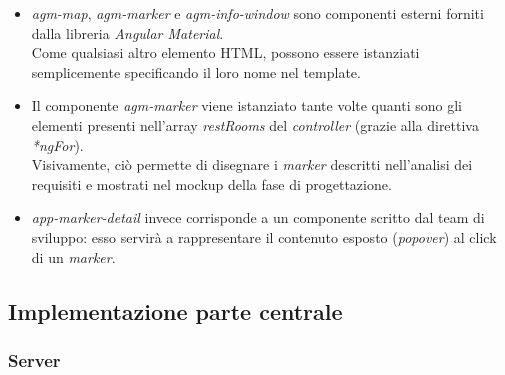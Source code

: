 \documentclass[12pt]{article}
\begin{document}
\begin{itemize}
	\item \textit{agm-map}, \textit{agm-marker} e \textit{agm-info-window} sono componenti esterni forniti dalla libreria \textit{Angular Material}.\\ Come qualsiasi altro elemento HTML, possono essere  istanziati semplicemente specificando il loro nome nel template. 
	\item Il componente \textit{agm-marker} viene istanziato tante volte quanti sono gli elementi presenti nell'array \textit{restRooms} del \textit{controller} (grazie alla direttiva \textit{*ngFor}).\\ Visivamente, ciò permette di disegnare i \textit{marker} descritti nell'analisi dei requisiti e mostrati nel mockup della fase di progettazione.
	\item \textit{app-marker-detail} invece corrisponde a un componente scritto dal team di sviluppo: esso servirà a rappresentare il contenuto esposto (\textit{popover}) al click di un \textit{marker}.
\end{itemize}
\newpage
\subsection{Implementazione parte centrale}
\subsubsection{Server}
\end{document}
